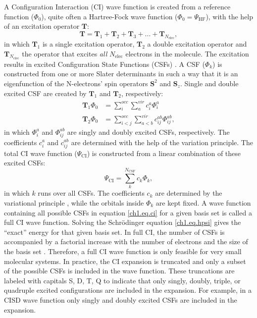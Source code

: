 A Configuration Interaction (CI) wave function is created from a reference function ($\Phi_0$), quite often a Hartree-Fock wave function ($\Phi_0 = \Psi_\mathrm{HF}$), with the help of an excitation operator $\mathbf{T}$:
\begin{equation}
\mathbf{T}=\mathbf{T}_1 + \mathbf{T}_2 + \mathbf{T}_3 + ... + \mathbf{T}_{N_{\mathrm{elec}}},
\label{ch1.eq.ciexcitation}
\end{equation}
in which $\mathbf{T}_1$ is a single excitation operator, $\mathbf{T}_2$ a double excitation operator and $\mathbf{T}_{N_{\mathrm{elec}}}$ the operator that excites \textit{all} $N_{\mathrm{elec}}$ electrons in the molecule. The excitation results in excited Configuration State Functions (CSFs) \cite{shavitt1,shavitt2}. A CSF ($\Phi_k$) is constructed from one or more Slater determinants in such a way that it is an eigenfunction of the N-electrons' spin operators $\mathbf{S}^2$ and $\mathbf{S}_z$. Single and double excited CSF are created by $\mathbf{T}_1$ and $\mathbf{T}_2$, respectively:
\begin{equation}
\begin{split}
\mathbf{T}_1 \Phi_0 & = \sum_i^{occ} \sum_a^{vir} c_i^a \Phi_i^a \\
\mathbf{T}_2 \Phi_0 & = \sum_{i<j}^{occ} \sum_{a<b}^{vir} c_{ij}^{ab} \Phi_{ij}^{ab},
\end{split}
\label{ch1.eq.ciexcited}
\end{equation}
in which $\Phi_i^a$ and $\Phi_{ij}^{ab}$ are singly and doubly excited CSFs, respectively. The coefficients $c_i^a$ and $c_{ij}^{ab}$ are determined with the help of the variation principle. The total CI wave function ($\Psi_{\mathrm{CI}}$) is constructed from a linear combination of these excited CSFs:
\begin{equation}
\Psi_{\mathrm{CI}} = \sum_{k}^{N_{\mathrm{CSF}}} c_k \Phi_k,
\label{ch1.eq.ci}
\end{equation}
in which $k$ runs over all CSFs. The coefficients $c_k$ are determined by the variational principle \cite{varia}, while the orbitals inside $\Phi_k$ are kept fixed. A wave function containing all possible CSFs in equation \ref{ch1.eq.ci} for a given basis set is called a full CI wave function. Solving the Schr\"{o}dinger equation \ref{ch1.eq.hpsi} gives the ``exact'' energy for that given basis set. In full CI, the number of CSFs is accompanied by a factorial increase with the number of electrons and the size of the basis set \cite{weyl}. Therefore, a full CI wave function is only feasible for very small molecular systems. In practice, the CI expansion is truncated and only a subset of the possible CSFs is included in the wave function. These truncations are labeled with capitals S, D, T, Q to indicate that only singly, doubly, triple, or quadruple excited configurations are included in the expansion. For example, in a CISD wave function only singly and doubly excited CSFs are included in the expansion.

